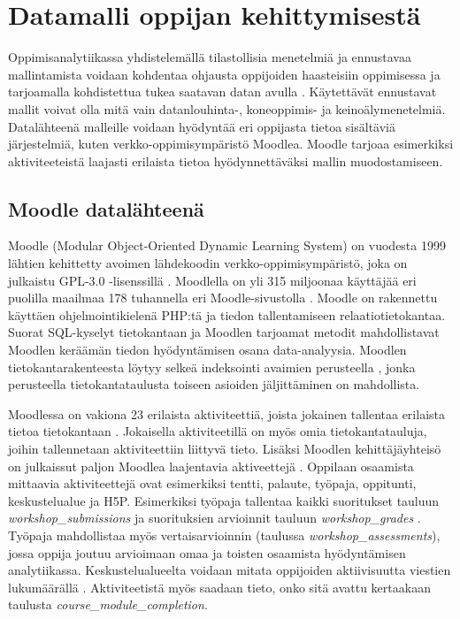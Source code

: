 \color{black}
\chapter{Datamalli oppijan kehittymisestä\label{datamallioppijankehittymisesta}}

Oppimisanalytiikassa yhdistelemällä tilastollisia menetelmiä ja ennustavaa mallintamista voidaan kohdentaa ohjausta oppijoiden haasteisiin oppimisessa ja tarjoamalla kohdistettua tukea saatavan datan avulla \citep{ranjeethSurveyPredictiveModels2020}. Käytettävät ennustavat mallit voivat olla mitä vain datanlouhinta-, koneoppimis- ja keinoälymenetelmiä. Datalähteenä malleille voidaan hyödyntää eri oppijasta tietoa sisältäviä järjestelmiä, kuten verkko-oppimisympäristö Moodlea. Moodle tarjoaa esimerkiksi aktiviteeteistä laajasti erilaista tietoa hyödynnettäväksi mallin muodostamiseen.

\section{Moodle datalähteenä}

Moodle (Modular Object-Oriented Dynamic Learning System) on vuodesta 1999 lähtien kehittetty avoimen lähdekoodin verkko-oppimisympäristö, joka on julkaistu GPL-3.0 -lisenssillä \citep{dougiamasPowerOpenEducational2021,dougiamasMoodle2022}. Moodlella on yli 315 miljoonaa käyttäjää eri puolilla maailmaa 178 tuhannella eri Moodle-sivustolla \citep{moodle.orgMoodleStatistics}. Moodle on rakennettu käyttäen ohjelmointikielenä PHP:tä ja tiedon tallentamiseen relaatiotietokantaa. Suorat SQL-kyselyt tietokantaan ja Moodlen tarjoamat metodit mahdollistavat Moodlen keräämän tiedon hyödyntämisen osana data-analyysia. Moodlen tietokantarakenteesta löytyy selkeä indeksointi avaimien perusteella \citep{greenMoodle11Database2022}, jonka perusteella tietokantataulusta toiseen asioiden jäljittäminen on mahdollista.

Moodlessa on vakiona 23 erilaista aktiviteettiä, joista jokainen tallentaa erilaista tietoa tietokantaan \citep{dougiamasMoodle2022}. Jokaisella aktiviteetillä on myös omia tietokantatauluja, joihin tallennetaan aktiviteettiin liittyvä tieto. Lisäksi Moodlen kehittäjäyhteisö on julkaissut paljon Moodlea laajentavia aktiveettejä \citep{moodle.orgMoodlePluginsDirectory2022}. Oppilaan osaamista mittaavia aktiviteettejä ovat esimerkiksi tentti, palaute, työpaja, oppitunti, keskustelualue ja H5P. Esimerkiksi työpaja tallentaa kaikki suoritukset tauluun \emph{workshop\_submissions} ja suorituksien arvioinnit tauluun \emph{workshop\_grades} \citep{greenMoodle11Database2022}. Työpaja mahdollistaa myös vertaisarvioinnin (taulussa \emph{workshop\_assessments}), jossa oppija joutuu arvioimaan omaa ja toisten osaamista hyödyntämisen analytiikassa. Keskustelualueelta voidaan mitata oppijoiden aktiivisuutta viestien lukumäärällä \citep{mwalumbweUsingLearningAnalytics2017}. Aktiviteetistä myös saadaan tieto, onko sitä avattu kertaakaan taulusta \emph{course\_module\_completion}.

